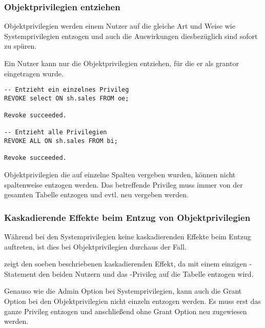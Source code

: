         \subsubsection{Objektprivilegien entziehen}
          Objektprivilegien werden einem Nutzer auf die gleiche Art und Weise wie Systemprivilegien entzogen und auch die Auswirkungen diesbezüglich sind sofort zu spüren.
          \begin{merke}
            Ein Nutzer kann nur die Objektprivilegien entziehen, für die er als grantor eingetragen wurde.
          \end{merke}
          \begin{lstlisting}[caption={Entziehen von Objektprivilegien},label=admin244,language=oracle_sql]
-- Entzieht ein einzelnes Privileg
REVOKE select ON sh.sales FROM oe;

Revoke succeeded.

-- Entzieht alle Privilegien
REVOKE ALL ON sh.sales FROM bi;

Revoke succeeded.
          \end{lstlisting}
          \begin{merke}
            Objektprivilegien die auf einzelne Spalten vergeben wurden, können nicht spaltenweise entzogen werden. Das betreffende Privileg muss immer von der gesamten Tabelle entzogen und evtl. neu vergeben werden.
          \end{merke}
        \subsubsection{Kaskadierende Effekte beim Entzug von Objektprivilegien}
          Während bei den Systemprivilegien keine kaskadierenden Effekte beim
          Entzug auftreten, ist dies bei Objektprivilegien durchaus der Fall.

           zeigt den soeben beschriebenen kaskadierenden
          Effekt, da mit einem einzigen -Statement den
          beiden Nutzern  und  das
          -Privileg auf die Tabelle 
          entzogen wird.
          \begin{merke}
            Genauso wie die Admin Option bei Systemprivilegien, kann auch die
            Grant Option bei den Objektprivilegien nicht einzeln entzogen
            werden. Es muss erst das ganze Privileg entzogen und
            anschließend ohne Grant Option neu zugewiesen werden.
          \end{merke}
          
